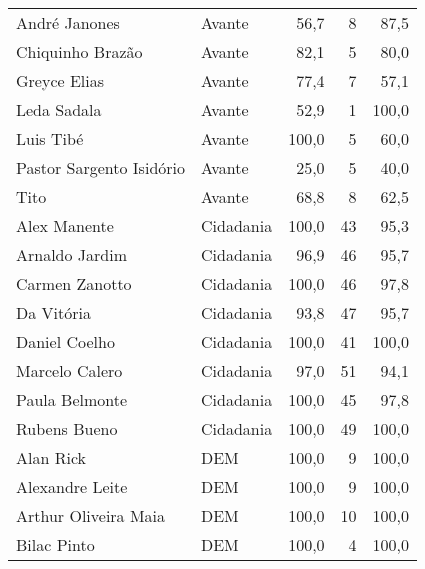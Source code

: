 \begin{longtable}{llrrr}
\bottomrule
\endlastfoot
                       André Janones &         Avante &      56,7 &            8 &       87,5 \\
                    Chiquinho Brazão &         Avante &      82,1 &            5 &       80,0 \\
                        Greyce Elias &         Avante &      77,4 &            7 &       57,1 \\
                         Leda Sadala &         Avante &      52,9 &            1 &      100,0 \\
                           Luis Tibé &         Avante &     100,0 &            5 &       60,0 \\
            Pastor Sargento Isidório &         Avante &      25,0 &            5 &       40,0 \\
                                Tito &         Avante &      68,8 &            8 &       62,5 \\
                        Alex Manente &      Cidadania &     100,0 &           43 &       95,3 \\
                      Arnaldo Jardim &      Cidadania &      96,9 &           46 &       95,7 \\
                      Carmen Zanotto &      Cidadania &     100,0 &           46 &       97,8 \\
                          Da Vitória &      Cidadania &      93,8 &           47 &       95,7 \\
                       Daniel Coelho &      Cidadania &     100,0 &           41 &      100,0 \\
                      Marcelo Calero &      Cidadania &      97,0 &           51 &       94,1 \\
                      Paula Belmonte &      Cidadania &     100,0 &           45 &       97,8 \\
                        Rubens Bueno &      Cidadania &     100,0 &           49 &      100,0 \\
                           Alan Rick &            DEM &     100,0 &            9 &      100,0 \\
                     Alexandre Leite &            DEM &     100,0 &            9 &      100,0 \\
                Arthur Oliveira Maia &            DEM &     100,0 &           10 &      100,0 \\
                         Bilac Pinto &            DEM &     100,0 &            4 &      100,0 \\

\end{longtable}
